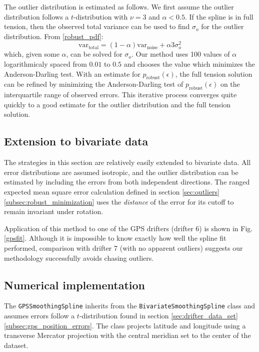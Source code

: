 \documentclass{ametsoc}
\begin{document}
The outlier distribution is estimated as follows. We first assume the outlier distribution follows a $t$-distribution with $\nu=3$ and $\alpha<0.5$. If the spline is in full tension, then the observed total variance can be used to find $\sigma_o$ for the outlier distribution. From \eqref{robust_pdf}:
\begin{equation}
    \textrm{var}_\textrm{total} = (1-\alpha) \textrm{var}_\textrm{noise} + \alpha 3 \sigma_o^2
\end{equation}
which, given some $\alpha$, can be solved for $\sigma_o$. Our method uses 100 values of $\alpha$ logarithmicaly spaced from $0.01$ to $0.5$ and chooses the value which minimizes the Anderson-Darling test. With an estimate for $p_{\textrm{robust}}(\epsilon)$, the full tension solution can be refined by minimizing the Anderson-Darling test of $p_{\textrm{robust}}(\epsilon)$ on the interquartile range of observed errors. This iterative process converges quite quickly to a good estimate for the outlier distribution and the full tension solution.

\subsection{Extension to bivariate data}
\label{subsec:robust_bivariate}

The strategies in this section are relatively easily extended to bivariate data. All error distributions are assumed isotropic, and the outlier distribution can be estimated by including the errors from both independent directions. The ranged expected mean square error calculation defined in section \ref{sec:outliers}\ref{subsec:robust_minimization} uses the \emph{distance} of the error for its cutoff to remain invariant under rotation.

Application of this method to one of the GPS drifters (drifter 6) is shown in Fig. \ref{gpsfit}. Although it is impossible to know exactly how well the spline fit performed, comparison with drifter 7 (with no apparent outliers) suggests our methodology successfully avoids chasing outliers.

\subsection{Numerical implementation}

The \texttt{GPSSmoothingSpline} inherits from the \texttt{BivariateSmoothingSpline} class and assumes errors follow a $t$-distribution found in section \ref{sec:drifter_data_set}\ref{subsec:gps_position_errors}. The class projects latitude and longitude using a transverse Mercator projection with the central meridian set to the center of the dataset.
\end{document}
